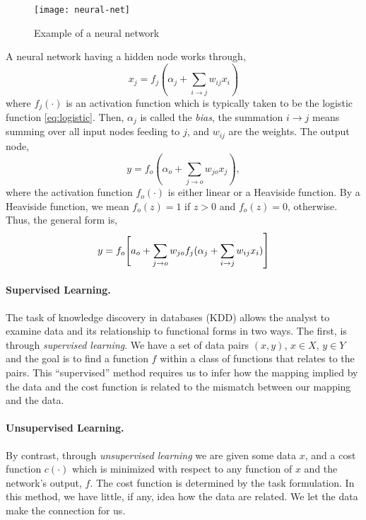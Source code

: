 \begin{figure}[tb]
	\centering
	\texttt{[image: neural-net]}
	\caption{Example of a neural network}
	\label{figure:neural-net}
\end{figure}

A neural network having a hidden node works through,
\[
x_j = f_j(\alpha_j + \sum_{i \to j} w_{ij} x_i)
\]
where $f_j(\cdot)$ is an activation function which is typically taken to be 
the logistic function \eqref{eq:logistic}. Then, $\alpha_j$ is called the \emph{bias}, the summation $i \to j$ means summing over all input nodes feeding to $j$, and $w_{ij}$ are the weights.
The output node, 
\[
y=f_o(\alpha_o + \sum_{j \to o} w_{jo} x_j),
\]
where the activation function $f_o(\cdot)$ is either linear or a Heaviside 
function. By a Heaviside function, we mean $f_o(z) = 1$ if $z > 0$ and $f_o(z) = 0$, otherwise. Thus, the general form is,
\begin{equation}
y= f_o \Biggr[a_o + \sum_{j \to o} w_{jo} f_j \large( \alpha_j + \sum_{i \to j} w_{ij} x_i \large) \Biggr]
\end{equation}

\paragraph{Supervised Learning.} The task of knowledge discovery in databases (KDD) allows the analyst to examine data and its relationship to functional forms in two ways. The first, is through \emph{supervised learning}.  We have a set of data pairs $(x, y)$, $x \in X$, $y \in Y$ and the goal is to find a function $f$ within a class of functions that relates to the pairs. This ``supervised'' method requires us to infer how the mapping implied by the data and the cost function is related to the mismatch between our mapping and the data.

\paragraph{Unsupervised Learning.} By contrast, through \emph{unsupervised learning} we are given some data $x$, and a cost function $c(\cdot)$ which is minimized with respect to any function of $x$ and the network's output, $f$. The cost function is determined by the task formulation. In this method, we have little, if any, idea how the data are related. We let the data make the connection for us.

